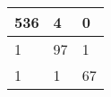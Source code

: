 \begin{tabular}{lll}
\hline
  536 & 4 & 0 \\
\hline
  1 & 97 & 1 \\
\hline
  1 & 1 & 67 \\
\hline
\end{tabular}
